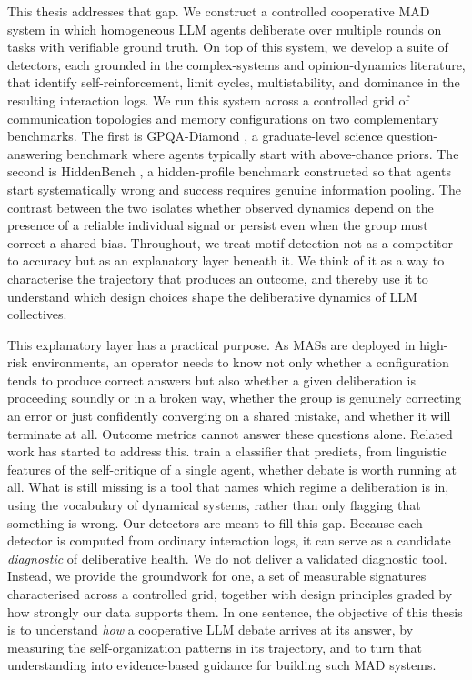 This thesis addresses that gap. We construct a controlled cooperative
\ac{MAD} system in which homogeneous \ac{LLM} agents deliberate over
multiple rounds on tasks with verifiable ground truth. On top of this system, we
develop a suite of detectors, each grounded in the complex-systems and
opinion-dynamics literature, that identify self-reinforcement, limit cycles,
multistability, and dominance in the resulting interaction logs. We run this system across a controlled grid of
communication topologies and memory configurations on two complementary
benchmarks. The first is GPQA-Diamond \citep{rein2024gpqa}, a graduate-level science
question-answering benchmark where agents typically start with above-chance priors.
The second is HiddenBench \citep{li2026hiddenbench}, a hidden-profile benchmark
constructed so that agents start systematically wrong and success requires
genuine information pooling. The contrast between the two isolates whether
observed dynamics depend on the presence of a reliable individual signal or
persist even when the group must correct a shared bias. Throughout, we treat
motif detection not as a competitor to accuracy but as an explanatory layer
beneath it. We think of it as a way to characterise the trajectory that produces an outcome, and
thereby use it to understand which design choices shape the deliberative dynamics of
\ac{LLM} collectives.

This explanatory layer has a practical purpose. As \acp{MAS} are
deployed in high-risk environments, an operator needs to know not only whether a
configuration tends to produce correct answers but also whether a given deliberation
is proceeding soundly or in a broken way, whether the group is genuinely
correcting an error or just confidently converging on a shared mistake, and whether it
will terminate at all. Outcome metrics cannot answer these questions alone.
Related work has started to address this. \citet{fan2026imad} train a classifier
that predicts, from linguistic features of the self-critique of a single agent,
whether debate is worth running at all. What is still missing is a tool that names which regime a deliberation
is in, using the vocabulary of dynamical systems, rather than only flagging that
something is wrong. Our detectors are meant to fill this gap. Because each detector is computed from
ordinary interaction logs, it can serve as a candidate \emph{diagnostic} of
deliberative health. We do not deliver a validated diagnostic tool. Instead,
we provide the groundwork for one, a set of measurable signatures
characterised across a controlled grid, together with design principles graded by
how strongly our data supports them.
In one sentence, the objective of this thesis is to understand \emph{how} a
cooperative \ac{LLM} debate arrives at its answer, by measuring the self-organization
patterns in its trajectory, and to turn that understanding into evidence-based
guidance for building such \ac{MAD} systems.

